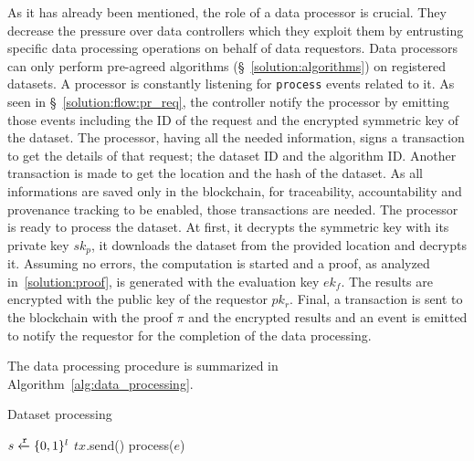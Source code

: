 As it has already been mentioned, the role of a data processor is crucial. They decrease the pressure over data controllers which they exploit them by entrusting specific data processing operations on behalf of data requestors. Data processors can only perform pre-agreed algorithms (§~\ref{solution:algorithms}) on registered datasets. A processor is constantly listening for \verb|process| events related to it. As seen in §~\ref{solution:flow:pr_req}, the controller notify the processor by emitting those events including the ID of the request and the encrypted symmetric key of the dataset. The processor, having all the needed information, signs a transaction to get the details of that request; the dataset ID and the algorithm ID. Another transaction is made to get the location and the hash of the dataset. As all informations are saved only in the blockchain, for traceability, accountability and provenance tracking to be enabled, those transactions are needed. The processor is ready to process the dataset. At first, it decrypts the symmetric key with its private key $sk_p$, it downloads the dataset from the provided location and decrypts it. Assuming no errors, the computation is started and a proof, as analyzed in~\ref{solution:proof}, is generated with the evaluation key $ek_f$. The results are encrypted with the public key of the requestor $pk_r$. Final, a transaction is sent to the blockchain with the proof $\pi$ and the encrypted results and an event is emitted to notify the requestor for the completion of the data processing.

The data processing procedure is summarized in Algorithm~\ref{alg:data_processing}.

\begin{algorithm}[!htb]
  \caption{Dataset processing}\label{alg:data_processing}
  \begin{algorithmic}[1]
     
     
     
     
     
    \State $s \xleftarrow{\mathtt{r}}{\{0, 1\}^{l}}$ 
     
     
     
     
    \State $tx$.send()
  \EndProcedure
     
      \State process($e$) 
    \EndWhile
  \EndProcedure
  \end{algorithmic}
\end{algorithm}

